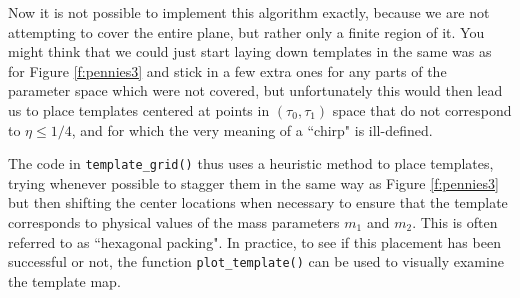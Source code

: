 Now it is not possible to implement this algorithm exactly, because we
are not attempting to cover the entire plane, but rather only a finite
region of it.  You might think that we could just start laying down
templates in the same was as for Figure \ref{f:pennies3} and stick in a
few extra ones for any parts of the parameter space which were not
covered, but unfortunately this would then lead us to place templates
centered at points in $(\tau_0,\tau_1)$ space that do not correspond to
$\eta \le 1/4$, and for which the very meaning of a ``chirp" is
ill-defined.

The code in {\tt template\_grid()} thus uses a heuristic method to
place templates, trying whenever possible to stagger them in the same
way as Figure \ref{f:pennies3} but then shifting the center locations
when necessary to ensure that the template corresponds to physical
values of the mass parameters $m_1$ and $m_2$.  This is often referred
to as ``hexagonal packing".  In practice, to see if this placement has
been successful or not, the function {\tt plot\_template()} can be used
to visually examine the template map.

